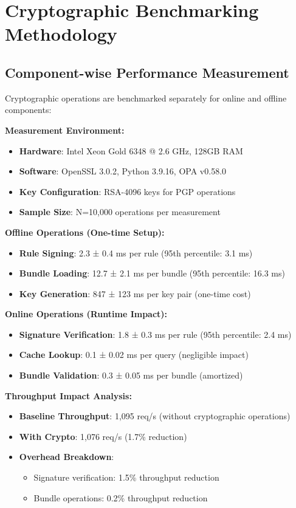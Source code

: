 \documentclass[sigconf,natbib]{acmart}
\begin{document}
\section{Cryptographic Benchmarking Methodology}
\label{app:crypto_benchmarking}

\subsection{Component-wise Performance Measurement}
Cryptographic operations are benchmarked separately for online and offline components:

\textbf{Measurement Environment:}
\begin{itemize}
    \item \textbf{Hardware}: Intel Xeon Gold 6348 @ 2.6 GHz, 128GB RAM
    \item \textbf{Software}: OpenSSL 3.0.2, Python 3.9.16, OPA v0.58.0
    \item \textbf{Key Configuration}: RSA-4096 keys for PGP operations
    \item \textbf{Sample Size}: N=10,000 operations per measurement
\end{itemize}

\textbf{Offline Operations (One-time Setup):}
\begin{itemize}
    \item \textbf{Rule Signing}: 2.3 ± 0.4 ms per rule (95th percentile: 3.1 ms)
    \item \textbf{Bundle Loading}: 12.7 ± 2.1 ms per bundle (95th percentile: 16.3 ms)
    \item \textbf{Key Generation}: 847 ± 123 ms per key pair (one-time cost)
\end{itemize}

\textbf{Online Operations (Runtime Impact):}
\begin{itemize}
    \item \textbf{Signature Verification}: 1.8 ± 0.3 ms per rule (95th percentile: 2.4 ms)
    \item \textbf{Cache Lookup}: 0.1 ± 0.02 ms per query (negligible impact)
    \item \textbf{Bundle Validation}: 0.3 ± 0.05 ms per bundle (amortized)
\end{itemize}

\textbf{Throughput Impact Analysis:}
\begin{itemize}
    \item \textbf{Baseline Throughput}: 1,095 req/s (without cryptographic operations)
    \item \textbf{With Crypto}: 1,076 req/s (1.7\% reduction)
    \item \textbf{Overhead Breakdown}:
    \begin{itemize}
        \item Signature verification: 1.5\% throughput reduction
        \item Bundle operations: 0.2\% throughput reduction
    \end{itemize}
\end{itemize}
\end{document}
